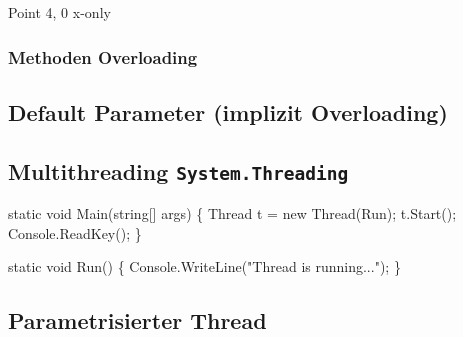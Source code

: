 \documentclass[
  10pt,
  a4paperpaper,
  DIV=11]{scrartcl}
\newenvironment{Shaded}{}{}
\newcommand{\DataTypeTok}[1]{\textcolor[rgb]{0.84,0.23,0.29}{#1}}
\newcommand{\FunctionTok}[1]{\textcolor[rgb]{0.44,0.26,0.76}{#1}}
\newcommand{\KeywordTok}[1]{\textcolor[rgb]{0.84,0.23,0.29}{#1}}
\newcommand{\NormalTok}[1]{\textcolor[rgb]{0.14,0.16,0.18}{#1}}
\newcommand{\OperatorTok}[1]{\textcolor[rgb]{0.14,0.16,0.18}{#1}}
\newcommand{\StringTok}[1]{\textcolor[rgb]{0.01,0.18,0.38}{#1}}
\numberwithin{equation}{section}
\begin{document}
\begin{Shaded}
\begin{Highlighting}[]
\NormalTok{Point 4, 0}
\NormalTok{x{-}only}
\end{Highlighting}
\end{Shaded}

\hypertarget{methoden-overloading}{%
\subsubsection{Methoden Overloading}\label{methoden-overloading}}

\hypertarget{default-parameter-implizit-overloading}{%
\subsection{Default Parameter (implizit
Overloading)}\label{default-parameter-implizit-overloading}}

\hypertarget{multithreading-system.threading}{%
\subsection{\texorpdfstring{Multithreading
\texttt{System.Threading}}{Multithreading System.Threading}}\label{multithreading-system.threading}}

\begin{Shaded}
\begin{Highlighting}[]
\KeywordTok{static} \DataTypeTok{void} \FunctionTok{Main}\OperatorTok{(}\DataTypeTok{string}\OperatorTok{[]}\NormalTok{ args}\OperatorTok{)} \OperatorTok{\{}
\NormalTok{  Thread t }\OperatorTok{=} \KeywordTok{new} \FunctionTok{Thread}\OperatorTok{(}\NormalTok{Run}\OperatorTok{);}
\NormalTok{  t}\OperatorTok{.}\FunctionTok{Start}\OperatorTok{();}
\NormalTok{  Console}\OperatorTok{.}\FunctionTok{ReadKey}\OperatorTok{();}
\OperatorTok{\}}

\KeywordTok{static} \DataTypeTok{void} \FunctionTok{Run}\OperatorTok{()} \OperatorTok{\{}
\NormalTok{  Console}\OperatorTok{.}\FunctionTok{WriteLine}\OperatorTok{(}\StringTok{"Thread is running..."}\OperatorTok{);}
\OperatorTok{\}}
\end{Highlighting}
\end{Shaded}

\hypertarget{parametrisierter-thread}{%
\subsection{Parametrisierter Thread}\label{parametrisierter-thread}}
\end{document}
